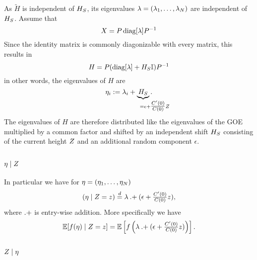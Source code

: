 As \(\tilde{H}\) is independent of \(H_S\), its eigenvalues
\(\lambda=(\lambda_1,\dots,\lambda_N)\) are independent of
\(H_S\). Assume that
\[
	X = P\operatorname{diag}[\lambda]P^{-1}
\]
Since the identity matrix is commonly diagonizable with every matrix, this
results in
\[
	H = P(\operatorname{diag}[\lambda] + H_S\mathbb{I}) P^{-1}
\]
in other words, the eigenvalues of \(H\) are
\[
	\evH_i
	:= \evGOE_i + \underbrace{\shift}_{=\epsilon \mathrlap{+ \tfrac{\sqC'(0)}{\sqC(0)}\rf}}.
\]
The eigenvalues of \(H\) are therefore distributed like the eigenvalues of the
GOE multiplied by a common factor and shifted by an independent shift \(H_S\)
consisting of the current height \(Z\) and an additional random component
\(\epsilon\).

\subsection{\texorpdfstring{\(\eta\mid Z\)}{Λ|Z}}
\label{subsec: Lambda|rf}

In particular we have for \(\eta = (\eta_1,\dots,\eta_N)\)
\[
	(\eta \mid Z = z)
	\overset{d}= 
	\lambda \mathbin{.+} (\epsilon + \tfrac{C'(0)}{C(0)}z),
\]
where \(\mathbin{.+}\) is entry-wise addition.
More specifically we have
\begin{equation}\label{eq: expectation f(Lambda) | Z}
		\mathbb{E}[f(\eta)\mid Z=z]
		= \mathbb{E}\left[
			f\left(\lambda \mathbin{.+} (\epsilon+\tfrac{C'(0)}{C(0)}z)\right)
		\right].
\end{equation}

\subsection{\texorpdfstring{\(Z\mid\eta\)}{Z|Λ}}


